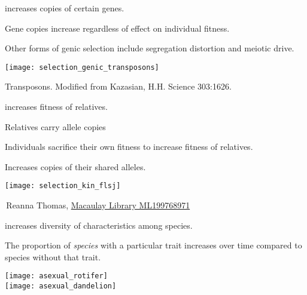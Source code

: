 \documentclass[t]{beamer}
\begin{document}
\begin{frame}[t,plain]{ increases copies of certain genes.}

\begin{multicols}{2}
\hangpara Gene copies increase regardless of effect on individual fitness.

\hangpara Other forms of genic selection include segregation distortion and meiotic drive.

\columnbreak

\texttt{[image: selection\_genic\_transposons]}

\end{multicols}

\vfilll

\tiny \hfill Transposons. Modified from Kazasian, H.H. Science 303:1626.

\end{frame}


\begin{frame}[t]{ increases fitness of relatives.}

\vspace{-\baselineskip}

\begin{multicols}{2}

\hangpara Relatives carry allele copies 

\hangpara Individuals sacrifice their own fitness to increase fitness of relatives.

\hangpara Increases copies of their shared alleles.

\columnbreak

\texttt{[image: selection\_kin\_flsj]}

\end{multicols}

\vfilll

\tiny \hfill \textcopyright\,Reanna Thomas, \href{https://macaulaylibrary.org/asset/199768971}{Macaulay Library ML199768971}

\end{frame}


\begin{frame}[t]{ increases diversity of characteristics among species.}

\vspace{-\baselineskip}

\begin{multicols}{2}

The proportion of \textit{species} with a particular trait increases over time compared to species without that trait.


\columnbreak

\texttt{[image: asexual\_rotifer]}\\
\texttt{[image: asexual\_dandelion]}
\end{multicols}

\end{frame}
\end{document}
